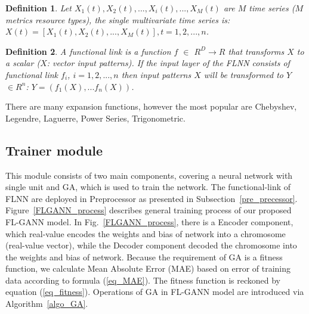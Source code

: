 \documentclass[conference]{IEEEtran}
\newtheorem{definition}{Definition}
\begin{document}
\begin{definition}
\label{definition_1}
Let $X_1(t), X_2(t),. . . , X_i(t),. . . , X_M(t) $ are $M$ time series ($M$ metrics resource types), the single multivariate time series is: \\
$ X(t) = \left[ X_1(t), X_2(t), . . . , X_M (t) \right],  t = 1, 2, . . . , n$.
\end{definition}

\begin{definition}
\label{definition_2}
A functional link is a function $f$ $\in$ $R^D \rightarrow R$ that transforms $X$ to a scalar ($X$: vector input patterns). If the input layer of the FLNN consists of functional link $f_i$, $i = 1,2,..., n$ then input patterns $X$ will be transformed to $Y$ $\in R^n$: $Y = (f_1(X),... f_n(X))$. 
\end{definition}

There are many expansion functions, however the most popular are Chebyshev, Legendre, Laguerre, Power Series, Trigonometric. 

\subsection{Trainer module}
\label{learning_model}
This module consists of two main components, covering a neural network with single unit and GA, which is used to train the network. The functional-link of FLNN are deployed in Preprocessor as presented in Subsection~\ref{pre_precessor}. Figure~\ref{FLGANN_process} describes general training process of our proposed FL-GANN model. In Fig.~\ref{FLGANN_process}, there is a Encoder component, which real-value encodes the weights and bias of network into a chromosome (real-value vector), while the Decoder component decoded the chromosome into the weights and bias of network. Because the requirement of GA is a fitness function, we calculate Mean Absolute Error (MAE) based on error of training data according to formula (\ref{eq_MAE}). The fitness function is reckoned by equation (\ref{eq_fitness}). Operations of GA in FL-GANN model are introduced via Algorithm~\ref{algo_GA}.
\end{document}
